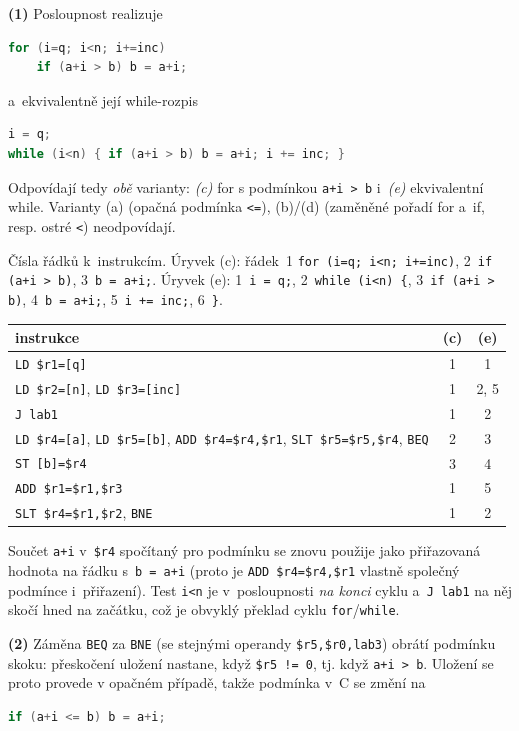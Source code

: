\medskip
\noindent\textbf{(1)} Posloupnost realizuje
\begin{lstlisting}[language=C]
for (i=q; i<n; i+=inc)
    if (a+i > b) b = a+i;
\end{lstlisting}
a~ekvivalentně její while-rozpis
\begin{lstlisting}[language=C]
i = q;
while (i<n) { if (a+i > b) b = a+i; i += inc; }
\end{lstlisting}
Odpovídají tedy \emph{obě} varianty: \emph{(c)} for s podmínkou \texttt{a+i > b}
i~\emph{(e)} ekvivalentní while. Varianty (a) (opačná podmínka \texttt{<=}),
(b)/(d) (zaměněné pořadí for a~if, resp. ostré \texttt{<}) neodpovídají.

\medskip
\noindent Čísla řádků k~instrukcím. Úryvek (c): řádek~1 \texttt{for (i=q; i<n; i+=inc)},
2~\texttt{if (a+i > b)}, 3~\texttt{b = a+i;}. Úryvek (e): 1~\texttt{i = q;}, 2~\texttt{while (i<n) \{},
3~\texttt{if (a+i > b)}, 4~\texttt{b = a+i;}, 5~\texttt{i += inc;}, 6~\texttt{\}}.
\begin{center}
\begin{tabular}{lcc}
instrukce & (c) & (e) \\ \hline
\texttt{LD \$r1=[q]} & 1 & 1 \\
\texttt{LD \$r2=[n]}, \texttt{LD \$r3=[inc]} & 1 & 2, 5 \\
\texttt{J lab1} & 1 & 2 \\
\texttt{LD \$r4=[a]}, \texttt{LD \$r5=[b]}, \texttt{ADD \$r4=\$r4,\$r1}, \texttt{SLT \$r5=\$r5,\$r4}, \texttt{BEQ} & 2 & 3 \\
\texttt{ST [b]=\$r4} & 3 & 4 \\
\texttt{ADD \$r1=\$r1,\$r3} & 1 & 5 \\
\texttt{SLT \$r4=\$r1,\$r2}, \texttt{BNE} & 1 & 2 \\
\end{tabular}
\end{center}
Součet \texttt{a+i} v~\texttt{\$r4} spočítaný pro podmínku se znovu použije jako přiřazovaná
hodnota na řádku s~\texttt{b = a+i} (proto je \texttt{ADD \$r4=\$r4,\$r1} vlastně společný
podmínce i~přiřazení). Test \texttt{i<n} je v~posloupnosti \emph{na konci} cyklu a~\texttt{J lab1}
na něj skočí hned na začátku, což je obvyklý překlad cyklu \texttt{for}/\texttt{while}.

\medskip
\noindent\textbf{(2)} Záměna \texttt{BEQ} za \texttt{BNE} (se stejnými operandy
\texttt{\$r5,\$r0,lab3}) obrátí podmínku skoku: přeskočení uložení nastane, když
\texttt{\$r5 != 0}, tj. když \texttt{a+i > b}. Uložení se proto provede v opačném
případě, takže podmínka v~C se změní na
\begin{lstlisting}[language=C]
if (a+i <= b) b = a+i;
\end{lstlisting}

